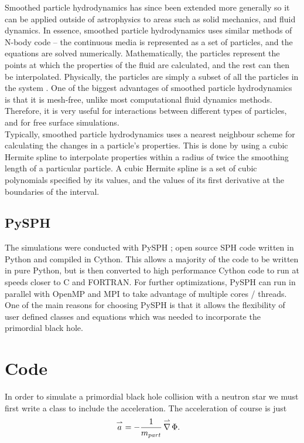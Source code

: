 Smoothed particle hydrodynamics has since been extended more generally so it can be applied outside of astrophysics to areas such as solid mechanics, and fluid dynamics. In essence, smoothed particle hydrodynamics uses similar methods of N-body code -- the continuous media is represented as a set of particles, and the equations are solved numerically. Mathematically, the particles represent the points at which the properties of the fluid are calculated, and the rest can then be interpolated. Physically, the particles are simply a subset of all the particles in the system \cite{newsph}. One of the biggest advantages of smoothed particle hydrodynamics is that it is mesh-free, unlike most computational fluid dynamics methods. Therefore, it is very useful for interactions between different types of particles, and for free surface simulations. \\

Typically, smoothed particle hydrodynamics uses a nearest neighbour scheme for calculating the changes in a particle's properties. This is done by using a cubic Hermite spline to interpolate properties within a radius of twice the smoothing length of a particular particle. A cubic Hermite spline is a set of cubic polynomials specified by its values, and the values of its first derivative at the boundaries of the interval.

\subsection{PySPH}
The simulations were conducted with PySPH \cite{pysph}; open source SPH code written in Python and compiled in Cython. This allows a majority of the code to be written in pure Python, but is then converted to high performance Cython code to run at speeds closer to C and FORTRAN. For further optimizations, PySPH can run in parallel with OpenMP and MPI to take advantage of multiple cores / threads. One of the main reasons for choosing PySPH is that it allows the flexibility of user defined classes and equations which was needed to incorporate the primordial black hole.

\section{Code}

In order to simulate a primordial black hole collision with a neutron star we must first write a class to include the acceleration. The acceleration of course is just
\begin{align*}
\overset{\rightharpoonup}a &= - \frac{1}{m_{part}} \operatorname{\overset{\rightharpoonup}\nabla} \Phi.
\end{align*}

